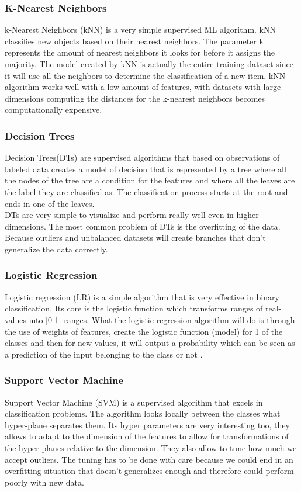 \subsubsection{K-Nearest Neighbors}
k-Nearest Neighbors (kNN) is a very simple supervised ML algorithm. kNN classifies new objects based on their nearest neighbors. The parameter k represents the amount of nearest neighbors it looks for before it assigns the majority. The model created by kNN is actually the entire training dataset since it will use all the neighbors to determine the classification of a new item. kNN algorithm works well with a low amount of features, with datasets with large dimensions computing the distances for the k-nearest neighbors becomes computationally expensive.

\subsubsection{Decision Trees}
Decision Trees(DTs) are supervised algorithms that based on observations of labeled data creates a model of decision that is represented by a tree where all the nodes of the tree are a condition for the features and where all the leaves are the label they are classified as. The classification process starts at the root and ends in one of the leaves.\\
DTs are very simple to visualize and perform really well even in higher dimensions. The most common problem of DTs is the overfitting of the data. Because outliers and unbalanced datasets will create branches that don't generalize the data correctly.

\subsubsection{Logistic Regression}
Logistic regression (LR) is a simple algorithm that is very effective in binary classification. Its core is the logistic function which transforms ranges of real-values into [0-1] ranges. What the logistic regression algorithm will do is through the use of weights of features, create the logistic function (model) for 1 of the classes and then for new values, it will output a probability which can be seen as a prediction of the input belonging to the class or not \cite{lr}.

\subsubsection{Support Vector Machine}
Support Vector Machine (SVM) is a supervised algorithm that excels in classification problems. The algorithm looks locally between the classes what hyper-plane separates them. 
Its hyper parameters are very interesting too, they allows to adapt to the dimension of the features to allow for transformations of the hyper-planes relative to the dimension. They also allow to tune how much we accept outliers. The tuning has to be done with care because we could end in an overfitting situation that doesn't generalizes enough and therefore could perform poorly with new data.

